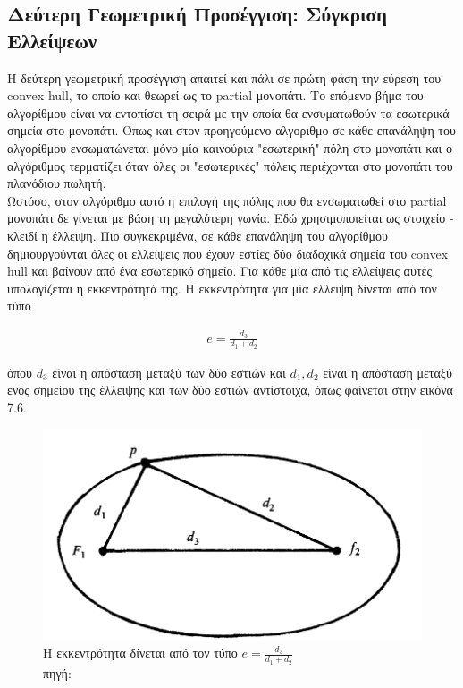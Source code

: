 \documentclass[oneside,12pt]{book}
\newenvironment{matlab}
	{\begin{figure}[hp]\centering\captionsetup{justification=centering}}
	{\end{figure}}
\theoremstyle{definition}
\begin{document}
\subsection{Δεύτερη Γεωμετρική Προσέγγιση: Σύγκριση Ελλείψεων} 

Η δεύτερη γεωμετρική προσέγγιση απαιτεί και πάλι σε πρώτη φάση την εύρεση του convex hull, το οποίο και θεωρεί ως το partial μονοπάτι. Το επόμενο βήμα του αλγορίθμου είναι να εντοπίσει τη σειρά με την οποία θα ενσυματωθούν τα εσωτερικά σημεία στο μονοπάτι. Όπως και στον προηγούμενο αλγοριθμο σε κάθε επανάληψη του αλγορίθμου ενσωματώνεται μόνο μία καινούρια "εσωτερική" πόλη στο μονοπάτι και ο αλγόριθμος τερματίζει όταν όλες οι "εσωτερικές" πόλεις περιέχονται στο μονοπάτι του πλανόδιου πωλητή. \\

Ωστόσο, στον αλγόριθμο αυτό η επιλογή της πόλης που θα ενσωματωθεί στο partial μονοπάτι δε γίνεται με βάση τη μεγαλύτερη γωνία. Εδώ χρησιμοποιείται ως στοιχείο - κλειδί η έλλειψη. Πιο συγκεκριμένα, σε κάθε επανάληψη του αλγορίθμου δημιουργούνται όλες οι ελλείψεις που έχουν εστίες δύο διαδοχικά σημεία του convex hull και βαίνουν από ένα εσωτερικό σημείο. Για κάθε μία από τις ελλείψεις αυτές υπολογίζεται η εκκεντρότητά της. Η εκκεντρότητα για μία έλλειψη δίνεται από τον τύπο

\begin{align*}
	e = \frac{d_3}{d_1 + d_2}
\end{align*}

όπου \(d_3\) είναι η απόσταση μεταξύ των δύο εστιών και \(d_1, d_2\) είναι η απόσταση μεταξύ ενός σημείου της έλλειψης και των δύο εστιών αντίστοιχα, όπως φαίνεται στην εικόνα 7.6. \\

\begin{matlab}
	\includegraphics[scale=0.3]{images/geometric_approach_ellipse1.png}
	\caption{Η εκκεντρότητα δίνεται από τον τύπο \(e = \frac{d_3}{d_1 + d_2}\)\\ πηγή: \cite{16}}
\end{matlab}
 
\end{document}
